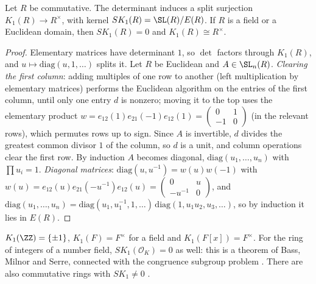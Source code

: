 \begin{proposition}\label{k-theory:proposition-k-one-euclidean}
Let $R$ be commutative. The determinant induces a split surjection $K_1(R) \to R^\times$, with kernel $SK_1(R) = \SL(R)/E(R)$. If $R$ is a field or a Euclidean domain, then $SK_1(R) = 0$ and $K_1(R) \cong R^\times$.
\end{proposition}

\begin{proof}
Elementary matrices have determinant $1$, so $\det$ factors through $K_1(R)$, and $u \mapsto \mathrm{diag}(u, 1, \ldots)$ splits it. Let $R$ be Euclidean and $A \in \SL_n(R)$. \emph{Clearing the first column}: adding
multiples of one row to another (left multiplication by elementary matrices) performs the Euclidean algorithm on the entries of the first column, until only one entry $d$ is nonzero; moving it to the top
uses the elementary product $w = e_{12}(1)e_{21}(-1)e_{12}(1) = \begin{pmatrix} 0 & 1 \\ -1 & 0 \end{pmatrix}$ (in the relevant rows), which permutes rows up to sign. Since $A$ is invertible, $d$ divides the
greatest common divisor $1$ of the column, so $d$ is a unit, and column operations clear the first row. By induction $A$ becomes diagonal, $\mathrm{diag}(u_1, \ldots, u_n)$ with $\prod u_i = 1$. \emph{Diagonal matrices}:
$\mathrm{diag}(u, u^{-1}) = w(u)w(-1)$ with $w(u) = e_{12}(u)e_{21}(-u^{-1})e_{12}(u) = \begin{pmatrix} 0 & u \\ -u^{-1} & 0 \end{pmatrix}$, and
$\mathrm{diag}(u_1, \ldots, u_n) = \mathrm{diag}(u_1, u_1^{-1}, 1, \ldots)\,\mathrm{diag}(1, u_1u_2, u_3, \ldots)$, so by induction it lies in $E(R)$.
\end{proof}

\begin{example}\label{k-theory:example-k-one}
$K_1(\ZZ) = \{\pm 1\}$, $K_1(F) = F^\times$ for a field and $K_1(F[x]) = F^\times$. For the ring of integers of a number field, $SK_1(\mathcal{O}_K) = 0$ as well: this is a theorem of Bass, Milnor and Serre, connected
with the congruence subgroup problem \cite{milnor-algebraic-k-theory}. There are also commutative rings with $SK_1 \neq 0$ \cite{milnor-algebraic-k-theory}.
\end{example}

